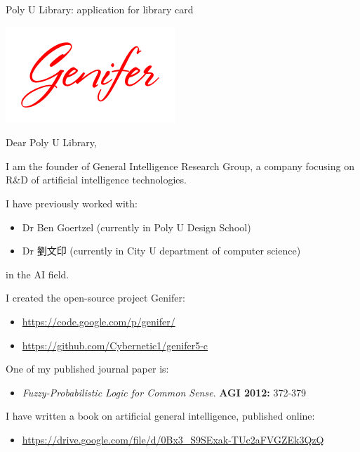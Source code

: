\documentclass[10pt,a4paper]{letter}
\begin{document}
 

\begin{letter}{Poly U Library: application for library card}

\includegraphics[scale=0.5]{genifer-logo-Stephenie-Marie.png}

\opening{Dear Poly U Library,} 
 
I am the founder of General Intelligence Research Group, a company focusing on R\&D of artificial intelligence technologies.

I have previously worked with:
\begin{itemize}
 \item  Dr Ben Goertzel (currently in Poly U Design School) 
 \item Dr 劉文印 (currently in City U department of computer science) 
\end{itemize}
in the AI field.

I created the open-source project Genifer:
\begin{itemize}
\item \hyperref[https://code.google.com/p/genifer/]{https://code.google.com/p/genifer/}
\item \hyperref[https://github.com/Cybernetic1/genifer5-c]{https://github.com/Cybernetic1/genifer5-c}
\end{itemize}

One of my published journal paper is:
\begin{itemize}
\item \textit{Fuzzy-Probabilistic Logic for Common Sense}. \textbf{AGI 2012:} 372-379
\end{itemize}

I have written a book on artificial general intelligence, published online:
\begin{itemize}
\item \hyperref[https://drive.google.com/file/d/0Bx3_S9SExak-TUc2aFVGZEk3QzQ]{https://drive.google.com/file/d/0Bx3\_S9SExak-TUc2aFVGZEk3QzQ}
\end{itemize}


\end{letter}
\end{document}
